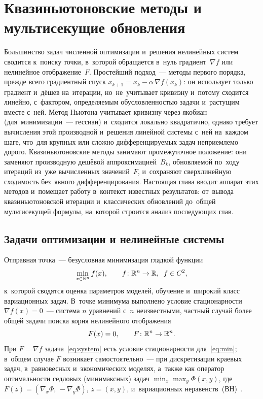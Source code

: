 \chapter{Квазиньютоновские методы и мультисекущие обновления}\label{ch:jacobian}

Большинство задач численной оптимизации и~решения нелинейных систем
сводится к~поиску точки, в~которой обращается в~нуль градиент~$\nabla f$
или нелинейное отображение~$F$. Простейший подход~--- методы первого
порядка, прежде всего градиентный спуск
$x_{k+1}=x_k-\alpha\,\nabla f(x_k)$: он использует только градиент
и~дёшев на~итерации, но~не~учитывает кривизну и~потому сходится
линейно, с~фактором, определяемым обусловленностью задачи и~растущим
вместе с~ней. Метод Ньютона учитывает кривизну через
якобиан (для~минимизации~--- гессиан) и~сходится локально квадратично,
однако требует вычисления этой производной и~решения линейной системы
с~ней на~каждом шаге, что~для крупных или сложно дифференцируемых
задач неприемлемо дорого. Квазиньютоновские методы занимают
промежуточное положение: они заменяют производную дешёвой
аппроксимацией~$B_k$, обновляемой по~ходу итераций из~уже вычисленных
значений~$F$, и~сохраняют сверхлинейную сходимость без~явного
дифференцирования. Настоящая глава вводит аппарат этих методов
и~помещает работу в~контекст известных результатов: от~вывода
квазиньютоновской итерации и~классических обновлений до~общей
мультисекущей формулы, на~которой строится анализ последующих глав.

\section{Задачи оптимизации и нелинейные системы}\label{sec:ch1_setup}

Отправная точка~--- безусловная минимизация гладкой функции
\begin{equation}\label{eq:min}
  \min_{x\in\mathbb{R}^n} f(x), \qquad f\colon\mathbb{R}^n\to\mathbb{R},\;\; f\in C^2,
\end{equation}
к~которой сводятся оценка параметров моделей, обучение и~широкий класс
вариационных задач. В~точке минимума выполнено условие стационарности
$\nabla f(x)=0$~--- система $n$ уравнений с~$n$ неизвестными, частный
случай более общей задачи поиска корня нелинейного отображения
\begin{equation}\label{eq:system}
  F(x) = 0, \qquad F\colon \mathbb{R}^n \to \mathbb{R}^n.
\end{equation}
При $F=\nabla f$ задача~\eqref{eq:system} есть условие стационарности
для~\eqref{eq:min}; в~общем случае $F$ возникает самостоятельно~---
при дискретизации краевых задач, в~равновесных и~экономических моделях,
а~также как оператор оптимальности седловых (минимаксных) задач
$\min_x\max_y \Phi(x,y)$, где $F(z)=(\nabla_x\Phi,\,-\nabla_y\Phi)$,
$z=(x,y)$, и~вариационных неравенств~(ВН)~\cite{viqa2024}.


